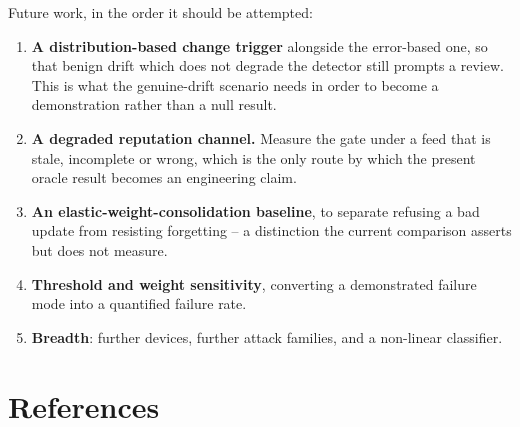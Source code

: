 \documentclass[12pt,a4paper]{report}
\begin{document}
Future work, in the order it should be attempted:

\begin{enumerate}[leftmargin=*,itemsep=4pt]
\item \textbf{A distribution-based change trigger} alongside the error-based one,
so that benign drift which does not degrade the detector still prompts a review.
This is what the genuine-drift scenario needs in order to become a demonstration
rather than a null result.
\item \textbf{A degraded reputation channel.} Measure the gate under a feed that
is stale, incomplete or wrong, which is the only route by which the present
oracle result becomes an engineering claim.
\item \textbf{An elastic-weight-consolidation baseline}, to separate refusing a
bad update from resisting forgetting -- a distinction the current comparison
asserts but does not measure.
\item \textbf{Threshold and weight sensitivity}, converting a demonstrated
failure mode into a quantified failure rate.
\item \textbf{Breadth}: further devices, further attack families, and a
non-linear classifier.
\end{enumerate}

\chapter*{References}
\end{document}
